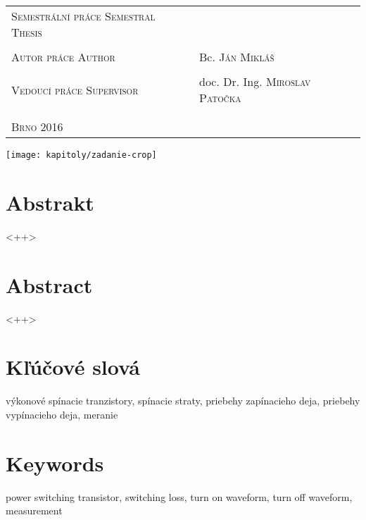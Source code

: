 \vspace{120pt}
\noindent
\begin{tabular}{p{}  p{} }
	\large\textsc{Semestrální práce}\newline
	\normalsize\textsc{Semestral Thesis}\\
	\\
	\large\textsc{Autor práce}\newline
	\normalsize\textsc{Author}		&	\normalsize Bc. \textsc{Ján Mikláš}\\
	\\
	\large\textsc{Vedoucí práce}\newline
	\normalsize\textsc{Supervisor}		&	\normalsize doc. Dr. Ing. \textsc{Miroslav Patočka}\\
	\\
	\\
	\normalsize\textsc{Brno 2016}
\end{tabular}
\par
\normalsize
\newpage

\thispagestyle{empty}
\hspace{-2cm}
\texttt{[image: kapitoly/zadanie-crop]}

\newpage
\thispagestyle{empty}
\section*{Abstrakt}
<++>
\paragraph{}


\section*{Abstract}
<++>



\newpage
\thispagestyle{empty}
\section*{Kľúčové slová}
výkonové spínacie tranzistory, spínacie straty, priebehy zapínacieho deja, priebehy vypínacieho deja, meranie
\vspace{30mm}
\section*{Keywords}
power switching transistor, switching loss, turn on waveform, turn off waveform, measurement

